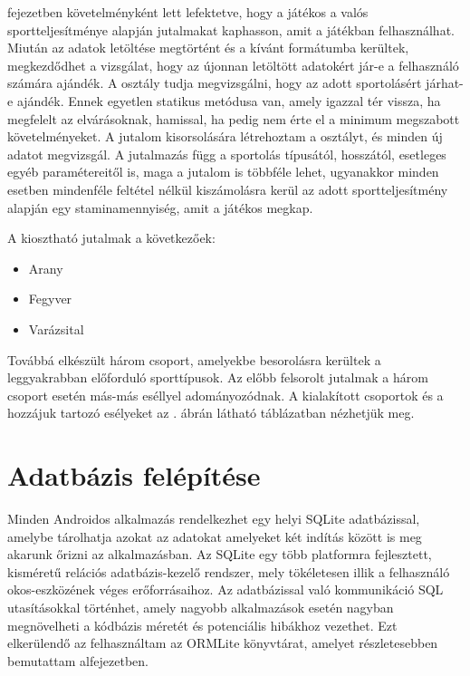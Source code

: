  fejezetben követelményként lett lefektetve, hogy a játékos a valós sportteljesítménye alapján jutalmakat kaphasson, amit a játékban felhasználhat. 
Miután az adatok letöltése megtörtént és a kívánt formátumba kerültek, megkezdődhet a vizsgálat, hogy az újonnan letöltött adatokért jár-e a felhasználó számára ajándék. 
A  osztály tudja megvizsgálni, hogy az adott sportolásért járhat-e ajándék. 
Ennek egyetlen statikus metódusa van, amely igazzal tér vissza, ha megfelelt az elvárásoknak, hamissal, ha pedig nem érte el a minimum megszabott követelményeket. 
A jutalom kisorsolására létrehoztam a  osztályt, és minden új adatot megvizsgál. 
A jutalmazás függ a sportolás típusától, hosszától, esetleges egyéb paramétereitől is, maga a jutalom is többféle lehet, ugyanakkor minden esetben mindenféle feltétel nélkül kiszámolásra kerül az adott sportteljesítmény alapján egy staminamennyiség, amit a játékos megkap. 

A kiosztható jutalmak a következőek:

\begin{itemize}
	\item Arany
	\item Fegyver 
	\item Varázsital 
\end{itemize}

Továbbá elkészült három csoport, amelyekbe besorolásra kerültek a leggyakrabban előforduló sporttípusok. 
Az előbb felsorolt jutalmak a három csoport esetén más-más eséllyel adományozódnak. 
A kialakított csoportok és a hozzájuk tartozó esélyeket az . ábrán látható táblázatban nézhetjük meg. 


\section{Adatbázis felépítése}
\label{database}

Minden Androidos alkalmazás rendelkezhet egy helyi SQLite adatbázissal, amelybe tárolhatja azokat az adatokat amelyeket két indítás között is meg akarunk őrizni az alkalmazásban. 
Az SQLite egy több platformra fejlesztett, kisméretű relációs adatbázis-kezelő rendszer, mely tökéletesen illik a felhasználó okos-eszközének véges erőforrásaihoz. 
Az adatbázissal való kommunikáció SQL utasításokkal történhet, amely nagyobb alkalmazások esetén nagyban megnövelheti a kódbázis méretét és potenciális hibákhoz vezethet. 
Ezt elkerülendő az felhasználtam az ORMLite könyvtárat, amelyet részletesebben bemutattam  alfejezetben. 

